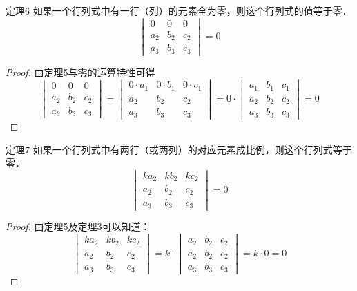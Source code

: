 \begin{blk}{定理6}
    如果一个行列式中有一行（列）的元素全为零，则这个行列式的值等于零．
    \[\begin{vmatrix}
        0&0&0\\a_2&b_2&c_2\\a_3&b_3&c_3
    \end{vmatrix}=0\]
\end{blk}

\begin{proof}
    由定理5与零的运算特性可得
\[\begin{vmatrix}
    0&0&0\\a_2&b_2&c_2\\a_3&b_3&c_3
\end{vmatrix}=\begin{vmatrix}
    0\cdot a_1&0\cdot b_1&0\cdot c_1\\a_2&b_2&c_2\\a_3&b_3&c_3
\end{vmatrix}=0\cdot\begin{vmatrix}
    a_1&b_1&c_1\\a_2&b_2&c_2\\a_3&b_3&c_3
\end{vmatrix}=0\]
\end{proof}

\begin{blk}{定理7}
    如果一个行列式中有两行（或两列）的对应元素成比例，则这个行列式等于零．
\[\begin{vmatrix}
    ka_2&kb_2&kc_2\\a_2&b_2&c_2\\a_3&b_3&c_3
\end{vmatrix}=0\]
\end{blk}

\begin{proof}
    由定理5及定理3可以知道：
    \[\begin{vmatrix}
        ka_2&kb_2&kc_2\\a_2&b_2&c_2\\a_3&b_3&c_3
    \end{vmatrix}=k\cdot\begin{vmatrix}
        a_2&b_2&c_2\\a_2&b_2&c_2\\a_3&b_3&c_3
    \end{vmatrix}=k\cdot 0=0\]
\end{proof}

